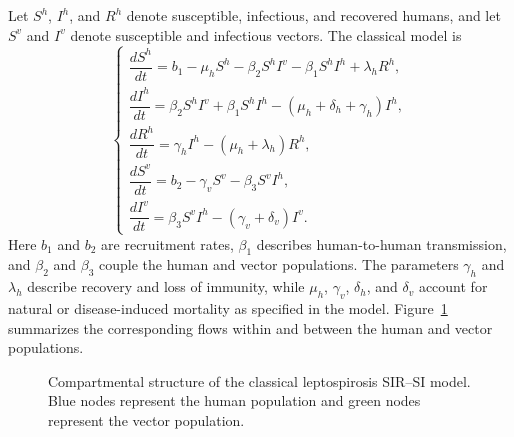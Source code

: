 \documentclass[00-main.tex]{subfiles}
\begin{document}
Let $S^h$, $I^h$, and $R^h$ denote susceptible, infectious, and recovered humans, and let $S^v$ and $I^v$ denote susceptible and infectious vectors. The classical model is
\[
\begin{cases}
 \dfrac{dS^h}{dt}=b_1-\mu_hS^h-\beta_2S^hI^v-\beta_1S^hI^h+\lambda_hR^h,\\[8pt]
 \dfrac{dI^h}{dt}=\beta_2S^hI^v+\beta_1S^hI^h-(\mu_h+\delta_h+\gamma_h)I^h,\\[8pt]
 \dfrac{dR^h}{dt}=\gamma_hI^h-(\mu_h+\lambda_h)R^h,\\[8pt]
 \dfrac{dS^v}{dt}=b_2-\gamma_vS^v-\beta_3S^vI^h,\\[8pt]
 \dfrac{dI^v}{dt}=\beta_3S^vI^h-(\gamma_v+\delta_v)I^v.
\end{cases}
\]
Here $b_1$ and $b_2$ are recruitment rates, $\beta_1$ describes human-to-human transmission, and $\beta_2$ and $\beta_3$ couple the human and vector populations. The parameters $\gamma_h$ and $\lambda_h$ describe recovery and loss of immunity, while $\mu_h$, $\gamma_v$, $\delta_h$, and $\delta_v$ account for natural or disease-induced mortality as specified in the model.
Figure~\ref{fig:leptospirosis-sir-si} summarizes the corresponding flows within and between the human and vector populations.

\begin{figure}[htbp]
\centering
{}
\caption{Compartmental structure of the classical leptospirosis SIR--SI model. Blue nodes represent the human population and green nodes represent the vector population.}
\label{fig:leptospirosis-sir-si}
\end{figure}
\end{document}
